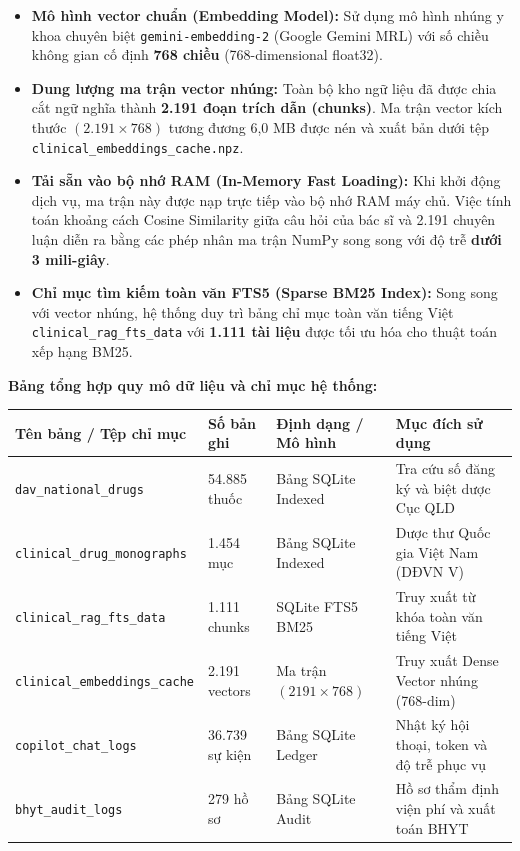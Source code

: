 \documentclass[12pt,a4paper]{article}
\begin{document}
\begin{itemize}[leftmargin=1.5em]
    \item \textbf{Mô hình vector chuẩn (Embedding Model):} Sử dụng mô hình nhúng y khoa chuyên biệt \texttt{gemini-embedding-2} (Google Gemini MRL) với số chiều không gian cố định \textbf{768 chiều} (768-dimensional float32).
    \item \textbf{Dung lượng ma trận vector nhúng:} Toàn bộ kho ngữ liệu đã được chia cắt ngữ nghĩa thành \textbf{2.191 đoạn trích dẫn (chunks)}. Ma trận vector kích thước \textbf{$(2.191 \times 768)$} tương đương 6,0 MB được nén và xuất bản dưới tệp \texttt{clinical\_embeddings\_cache.npz}.
    \item \textbf{Tải sẵn vào bộ nhớ RAM (In-Memory Fast Loading):} Khi khởi động dịch vụ, ma trận này được nạp trực tiếp vào bộ nhớ RAM máy chủ. Việc tính toán khoảng cách Cosine Similarity giữa câu hỏi của bác sĩ và 2.191 chuyên luận diễn ra bằng các phép nhân ma trận NumPy song song với độ trễ \textbf{dưới 3 mili-giây}.
    \item \textbf{Chỉ mục tìm kiếm toàn văn FTS5 (Sparse BM25 Index):} Song song với vector nhúng, hệ thống duy trì bảng chỉ mục toàn văn tiếng Việt \texttt{clinical\_rag\_fts\_data} với \textbf{1.111 tài liệu} được tối ưu hóa cho thuật toán xếp hạng BM25.
\end{itemize}

\vspace{0.6em}
\noindent \textbf{Bảng tổng hợp quy mô dữ liệu và chỉ mục hệ thống:}
\vspace{0.4em}

\begin{table}[htbp]
\centering
\small
\begin{tabularx}{\textwidth}{L{5.2cm} L{2.4cm} L{3.2cm} Y}
\toprule
\textbf{Tên bảng / Tệp chỉ mục} & \textbf{Số bản ghi} & \textbf{Định dạng / Mô hình} & \textbf{Mục đích sử dụng} \\
\midrule
\texttt{dav\_national\_drugs} & 54.885 thuốc & Bảng SQLite Indexed & Tra cứu số đăng ký và biệt dược Cục QLD \\
\texttt{clinical\_drug\_monographs} & 1.454 mục & Bảng SQLite Indexed & Dược thư Quốc gia Việt Nam (DĐVN V) \\
\texttt{clinical\_rag\_fts\_data} & 1.111 chunks & SQLite FTS5 BM25 & Truy xuất từ khóa toàn văn tiếng Việt \\
\texttt{clinical\_embeddings\_cache} & 2.191 vectors & Ma trận $(2191 \times 768)$ & Truy xuất Dense Vector nhúng (768-dim) \\
\texttt{copilot\_chat\_logs} & 36.739 sự kiện & Bảng SQLite Ledger & Nhật ký hội thoại, token và độ trễ phục vụ \\
\texttt{bhyt\_audit\_logs} & 279 hồ sơ & Bảng SQLite Audit & Hồ sơ thẩm định viện phí và xuất toán BHYT \\
\bottomrule
\end{tabularx}
\end{table}
\end{document}
